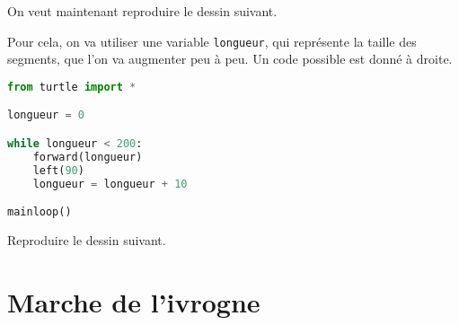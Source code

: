\documentclass[12pt]{article}
\begin{document}
\begin{multicols}{2}
On veut maintenant reproduire le dessin suivant.

\begin{center}
\end{center}

Pour cela, on va utiliser une variable \texttt{longueur}, qui représente la taille des segments, que l'on va augmenter peu à peu. Un code possible est donné à droite.

\columnbreak

\begin{lstlisting}[language=python,frame=single]
from turtle import *

longueur = 0

while longueur < 200:
    forward(longueur)
    left(90)
    longueur = longueur + 10

mainloop()
\end{lstlisting}

\end{multicols}

Reproduire le dessin suivant.
\begin{center}
\end{center}

\section{Marche de l'ivrogne}
\end{document}
